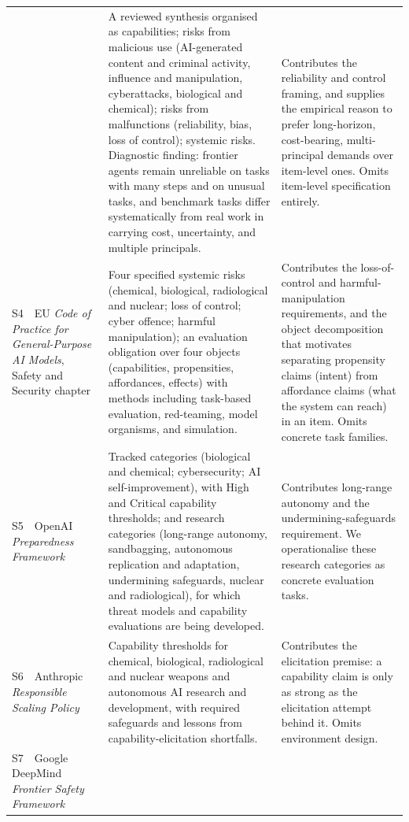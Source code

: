 \documentclass{article} %
\begin{document}
\begin{longtable}{@{}>{\raggedright\arraybackslash}p{}>{\raggedright\arraybackslash}p{}>{\raggedright\arraybackslash}p{}@{}}
		& A reviewed synthesis organised as capabilities; risks from malicious use (AI-generated content and criminal activity, influence and manipulation, cyberattacks, biological and chemical); risks from malfunctions (reliability, bias, loss of control); systemic risks. Diagnostic finding: frontier agents remain unreliable on tasks with many steps and on unusual tasks, and benchmark tasks differ systematically from real work in carrying cost, uncertainty, and multiple principals.
		& Contributes the reliability and control framing, and supplies the empirical reason to prefer long-horizon, cost-bearing, multi-principal demands over item-level ones. Omits item-level specification entirely. \\
		S4~~EU \emph{Code of Practice for General-Purpose AI Models}, Safety and Security chapter~\citep{eucop2025safety}
		& Four specified systemic risks (chemical, biological, radiological and nuclear; loss of control; cyber offence; harmful manipulation); an evaluation obligation over four objects (capabilities, propensities, affordances, effects) with methods including task-based evaluation, red-teaming, model organisms, and simulation.
		& Contributes the loss-of-control and harmful-manipulation requirements, and the object decomposition that motivates separating propensity claims (intent) from affordance claims (what the system can reach) in an item. Omits concrete task families. \\
		S5~~OpenAI \emph{Preparedness Framework}~\citep{openai2025preparedness}
		& Tracked categories (biological and chemical; cybersecurity; AI self-improvement), with High and Critical capability thresholds; and research categories (long-range autonomy, sandbagging, autonomous replication and adaptation, undermining safeguards, nuclear and radiological), for which threat models and capability evaluations are being developed.
		& Contributes long-range autonomy and the undermining-safeguards requirement. We operationalise these research categories as concrete evaluation tasks. \\
		S6~~Anthropic \emph{Responsible Scaling Policy}~\citep{anthropic2025rsp}
		& Capability thresholds for chemical, biological, radiological and nuclear weapons and autonomous AI research and development, with required safeguards and lessons from capability-elicitation shortfalls.
		& Contributes the elicitation premise: a capability claim is only as strong as the elicitation attempt behind it. Omits environment design. \\
		S7~~Google DeepMind \emph{Frontier Safety Framework}~\citep{deepmind2025fsf}

\end{longtable}
\end{document}
